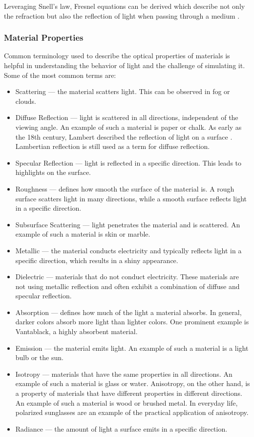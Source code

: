 Leveraging Snell's law, Fresnel equations can be derived which describe not only the refraction but also the reflection of light when passing through a medium \cite{fowles1989introduction}.

\subsubsection{Material Properties}

Common terminology used to describe the optical properties of materials is helpful in understanding the behavior of light and the challenge of simulating it. Some of the most common terms are:

\begin{itemize}
  \item{Scattering} — the material scatters light. This can be observed in fog or clouds.
  \item{Diffuse Reflection} — light is scattered in all directions, independent of the viewing angle. An example of such a material is paper or chalk. As early as the 18th century, Lambert described the reflection of light on a surface \cite{lambert1760photometria}. Lambertian reflection is still used as a term for diffuse reflection.
  \item{Specular Reflection} — light is reflected in a specific direction. This leads to highlights on the surface.
  \item{Roughness} — defines how smooth the surface of the material is. A rough surface scatters light in many directions, while a smooth surface reflects light in a specific direction.
  \item{Subsurface Scattering} — light penetrates the material and is scattered. An example of such a material is skin or marble.
  \item{Metallic} — the material conducts electricity and typically reflects light in a specific direction, which results in a shiny appearance.
  \item{Dielectric} — materials that do not conduct electricity. These materials are not using metallic reflection and often exhibit a combination of diffuse and specular reflection.
  \item{Absorption} — defines how much of the light a material absorbs. In general, darker colors absorb more light than lighter colors. One prominent example is Vantablack, a highly absorbent material.
  \item{Emission} — the material emits light. An example of such a material is a light bulb or the sun.
  \item{Isotropy} — materials that have the same properties in all directions. An example of such a material is glass or water. Anisotropy, on the other hand, is a property of materials that have different properties in different directions. An example of such a material is wood or brushed metal. In everyday life, polarized sunglasses are an example of the practical application of anisotropy.
  \item{Radiance} — the amount of light a surface emits in a specific direction.
\end{itemize}

